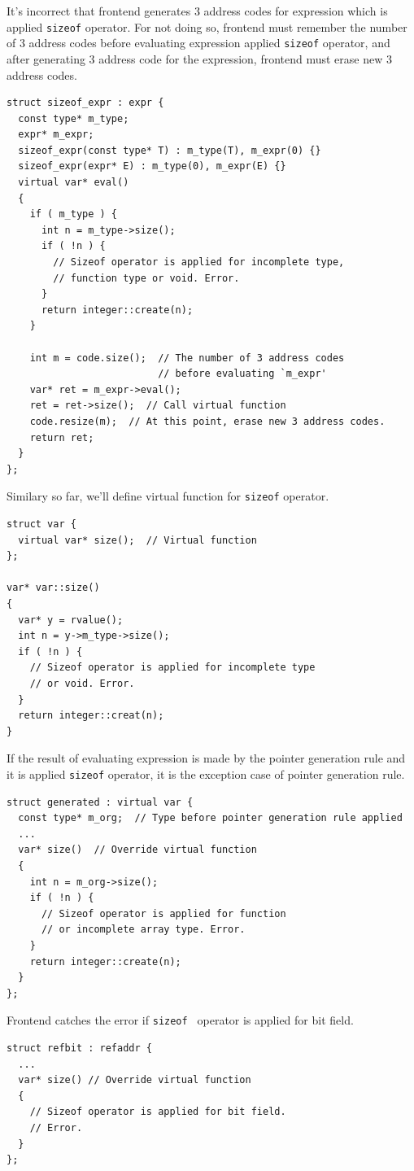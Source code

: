 It's incorrect that frontend generates 3 address codes
for expression which is applied {\tt{sizeof}} operator.
For not doing so, frontend must remember the number of 3 address codes
before evaluating expression applied {\tt{sizeof}} operator,
and after generating 3 address code for the expression,
frontend must erase new 3 address codes.
\begin{verbatim}
struct sizeof_expr : expr {
  const type* m_type;
  expr* m_expr;
  sizeof_expr(const type* T) : m_type(T), m_expr(0) {}
  sizeof_expr(expr* E) : m_type(0), m_expr(E) {}
  virtual var* eval()
  {
    if ( m_type ) {
      int n = m_type->size();
      if ( !n ) {
        // Sizeof operator is applied for incomplete type,
        // function type or void. Error.
      }
      return integer::create(n);
    }

    int m = code.size();  // The number of 3 address codes
                          // before evaluating `m_expr'
    var* ret = m_expr->eval();
    ret = ret->size();  // Call virtual function
    code.resize(m);  // At this point, erase new 3 address codes.
    return ret;
  }
};
\end{verbatim}
Similary so far, we'll define virtual function for {\tt{sizeof}} operator.
\begin{verbatim}
struct var {
  virtual var* size();  // Virtual function
};

var* var::size()
{
  var* y = rvalue();
  int n = y->m_type->size();
  if ( !n ) {
    // Sizeof operator is applied for incomplete type
    // or void. Error.
  }
  return integer::creat(n);
}
\end{verbatim}
If the result of evaluating expression is 
made by the pointer generation rule and it is applied
{\tt{sizeof}} operator, it is the exception case
of pointer generation rule.
\begin{verbatim}
struct generated : virtual var {
  const type* m_org;  // Type before pointer generation rule applied
  ...
  var* size()  // Override virtual function
  {
    int n = m_org->size();
    if ( !n ) {
      // Sizeof operator is applied for function
      // or incomplete array type. Error.
    }
    return integer::create(n);
  }
};
\end{verbatim}
Frontend catches the error if {\tt{sizeof }} operator is applied
for bit field.
\begin{verbatim}
struct refbit : refaddr {
  ...
  var* size() // Override virtual function
  {
    // Sizeof operator is applied for bit field.
    // Error.
  }
};
\end{verbatim}

